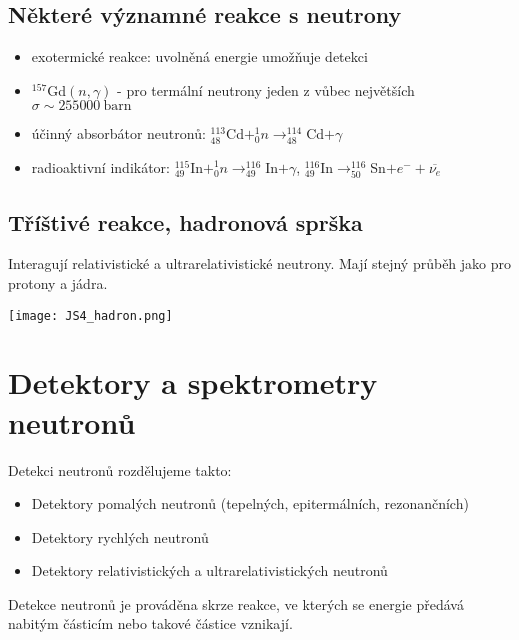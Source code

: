 \documentclass[../../main.tex]{subfiles}
\begin{document}
\subsection{Některé významné reakce s neutrony}

\begin{itemize}
	\item exotermické reakce: uvolněná energie umožňuje detekci
	\item $^{157}$Gd$(n,\gamma)$ - pro termální neutrony jeden z vůbec největších $\sigma \sim 255 000 ~\mathrm{barn}$
	\item účinný absorbátor neutronů: $^{113}_{48}$Cd$ + ^{1}_{0}n \rightarrow ^{114}_{48}$Cd$ + \gamma$
	\item radioaktivní indikátor: $^{115}_{49}$In$ + ^{1}_{0}n \rightarrow ^{116}_{49}$In$ + \gamma$, $^{116}_{49}$In$ \rightarrow ^{116}_{50}$Sn$ + e^- + \overline{\nu_e}$
	
\end{itemize}

\subsection{Tříštivé reakce, hadronová sprška}

Interagují relativistické a ultrarelativistické neutrony. Mají stejný průběh jako pro protony a  jádra.

\begin{center}
	\texttt{[image: JS4\_hadron.png]}
\end{center}

\section{Detektory a spektrometry neutronů}

Detekci neutronů rozdělujeme takto:
\begin{itemize}
	\item Detektory pomalých neutronů (tepelných, epitermálních, rezonančních)
	\item Detektory rychlých neutronů
	\item Detektory relativistických a ultrarelativistických neutronů
\end{itemize}

Detekce neutronů je prováděna skrze reakce, ve kterých se energie předává nabitým částicím nebo takové částice vznikají.
\end{document}
